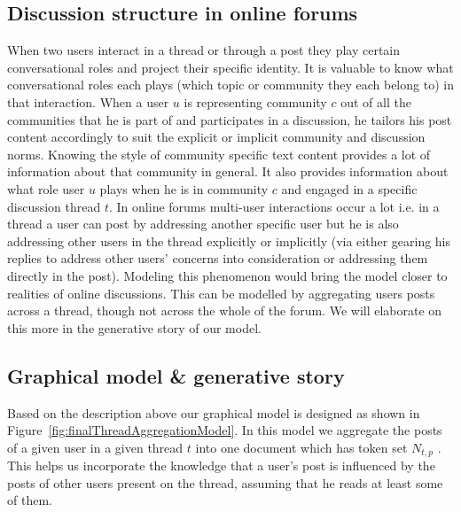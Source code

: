 \documentclass{sig-alternate}
\newcommand{\comment}[1]{\textcolor{red}{[#1]}}
\begin{document}
\subsection{Discussion structure in online forums}
When two users interact in a thread or through a post
they play certain conversational roles and project their specific identity.
It is valuable to know what conversational roles each plays (which topic or
community they each belong to) in that interaction. When a user $u$ is
representing community $c$ out of all the communities that he is part of and
participates in a discussion, he tailors his post content accordingly to suit
the explicit or implicit community and discussion norms. Knowing the style of
community specific text content provides a lot of information about that community 
in general. It also provides information about what role user $u$ plays when he
is in community $c$ and engaged in a specific discussion thread $t$. In online
forums multi-user interactions occur a lot i.e.
in a thread a user can post by addressing another specific user but he is
also addressing other users in the thread explicitly or implicitly (via either
gearing his replies to address other users' concerns into consideration or
addressing them directly in the post).
Modeling this phenomenon would bring the model closer to realities of online discussions.
This can be modelled by aggregating users posts across a thread,
though not across the whole of the forum. We will elaborate on this more in the
generative story of our model. 



\subsection{Graphical model \& generative story}
\label{sec:gen-story}
Based on the description above our graphical model is designed as shown
in Figure~\ref{fig:finalThreadAggregationModel}. In this model
we aggregate the posts of 
a given user in a given thread $t$ into one document which has token
set $N_{t,p}$ . This helps us incorporate the knowledge that a user's post is
influenced by the posts of other users present on the thread, assuming that
he reads at least some of them.
\end{document}
